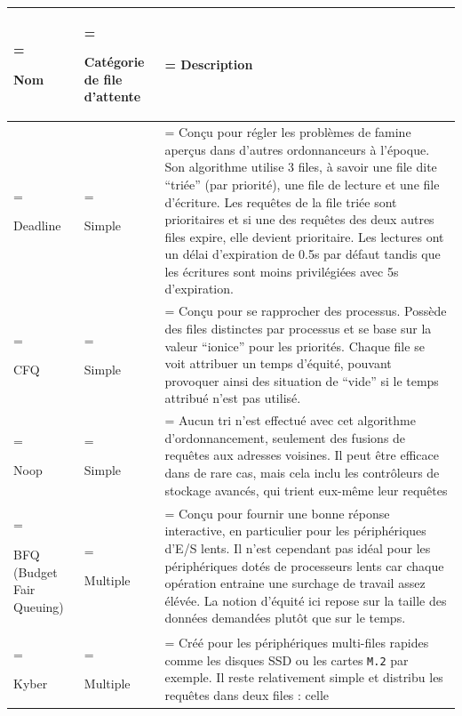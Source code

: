 \newpage
\begin{table}[h!t]
    \begin{tabularx}{\textwidth} { 
        | >{\hsize=0.20\hsize\linewidth=\hsize\raggedright\arraybackslash}X 
        | >{\hsize=0.26\hsize\linewidth=\hsize\raggedright\arraybackslash}X 
        | >{\hsize=1.53\hsize\linewidth=\hsize\arraybackslash}X | }
        \hline
        \textbf{Nom} & \textbf{Catégorie de file d'attente} & \textbf
        {Description} \\
        \hline
        \hline
        Deadline & Simple & Conçu pour régler les problèmes de famine aperçus 
        dans d'autres ordonnanceurs à l'époque. Son algorithme utilise 3 files, 
        à savoir une file dite ``triée'' (par priorité), une file de lecture et 
        une file d'écriture. Les requêtes de la file triée sont prioritaires et 
        si une des requêtes des deux autres files expire, elle devient 
        prioritaire. Les lectures ont un délai d'expiration de 0.5s par défaut 
        tandis que les écritures sont moins privilégiées avec 5s d'expiration. 
        \\
        \hline
        CFQ & Simple & Conçu pour se rapprocher des processus. Possède des 
        files distinctes par processus et se base sur la valeur ``ionice'' pour 
        les priorités. Chaque file se voit attribuer un temps d'équité, pouvant 
        provoquer ainsi des situation de ``vide'' si le temps attribué n'est 
        pas utilisé. \\
        \hline
        Noop & Simple & Aucun tri n'est effectué avec cet algorithme 
        d'ordonnancement, seulement des fusions de requêtes aux adresses 
        voisines. Il peut être efficace dans de rare cas, mais cela inclu les 
        contrôleurs de stockage avancés, qui trient eux-même leur requêtes \\
        \hline
        BFQ (Budget Fair Queuing) & Multiple & Conçu pour fournir une bonne 
        réponse interactive, en particulier pour les périphériques d'E/S lents. 
        Il n'est cependant pas idéal pour les périphériques dotés de 
        processeurs lents car chaque opération entraine une surchage de travail 
        assez élévée. La notion d'équité ici repose sur la taille des données 
        demandées plutôt que sur le temps. \\
        \hline
        Kyber & Multiple & Créé pour les périphériques multi-files rapides 
        comme les disques SSD ou les cartes \texttt{M.2} par exemple. Il reste 
        relativement simple et distribu les requêtes dans deux files : celle 

\end{tabularx}
\end{table}
